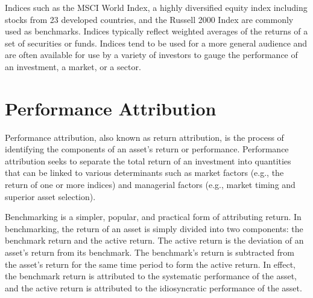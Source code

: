 \documentclass[11pt]{article}
\begin{document}
Indices such as the MSCI World Index, a highly diversified equity index including stocks from 23 developed countries, and the Russell 2000 Index are commonly used as benchmarks. Indices typically reflect weighted averages of the returns of a set of securities or funds. Indices tend to be used for a more general audience and are often available for use by a variety of investors to gauge the performance of an investment, a market, or a sector.

\section*{Performance Attribution}
Performance attribution, also known as return attribution, is the process of identifying the components of an asset's return or performance. Performance attribution seeks to separate the total return of an investment into quantities that can be linked to various determinants such as market factors (e.g., the return of one or more indices) and managerial factors (e.g., market timing and superior asset selection).

Benchmarking is a simpler, popular, and practical form of attributing return. In benchmarking, the return of an asset is simply divided into two components: the benchmark return and the active return. The active return is the deviation of an asset's return from its benchmark. The benchmark's return is subtracted from the asset's return for the same time period to form the active return. In effect, the benchmark return is attributed to the systematic performance of the asset, and the active return is attributed to the idiosyncratic performance of the asset.
\end{document}
